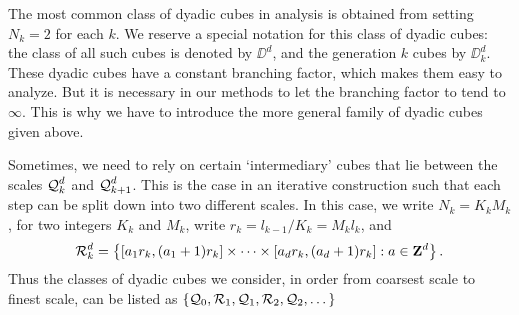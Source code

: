 The most common class of dyadic cubes in analysis is obtained from setting $N_k = 2$ for each $k$. We reserve a special notation for this class of dyadic cubes: the class of all such cubes is denoted by $\DD^d$, and the generation $k$ cubes by $\DD^d_k$.
These dyadic cubes have a constant branching factor, which makes them easy to analyze. But it is necessary in our methods to let the branching factor to tend to $\infty$. This is why we have to introduce the more general family of dyadic cubes given above.

Sometimes, we need to rely on certain `intermediary' cubes that lie between the scales $\operatorname{\mathcal{Q}}_k^d$ and $\operatorname{\mathcal{Q}}_{k+1}^d$. This is the case in an iterative construction such that each step can be split down into two different scales. In this case, we write $N_k = K_k M_k$, for two integers $K_k$ and $M_k$, write $r_k = l_{k-1}/K_k = M_k l_k$, and
%
\[ \operatorname{\mathcal{R}}_k^d = \left\{ [ a_1 r_k , (a_1 + 1) r_k ] \times \dots \times [ a_d r_k , (a_d + 1) r_k ] : a \in \mathbf{Z}^d \right\}. \]
%
Thus the classes of dyadic cubes we consider, in order from coarsest scale to finest scale, can be listed as $\{ \operatorname{\mathcal{Q}}_0, \operatorname{\mathcal{R}}_1, \operatorname{\mathcal{Q}}_1, \operatorname{\mathcal{R}}_2, \operatorname{\mathcal{Q}}_2, \dots \}$

%
%
%
%


